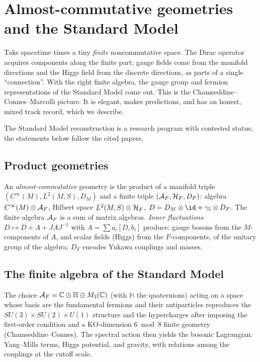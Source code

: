 \section{Almost-commutative geometries and the Standard Model}\label{ch:almost_comm}
\skippable

\begin{physmotiv}
Take spacetime times a tiny \emph{finite} noncommutative space. The Dirac operator acquires components along the finite part; gauge fields come from the manifold directions and the Higgs field from the discrete directions, as parts of a single ``connection''. With the right finite algebra, the gauge group and fermion representations of the Standard Model come out. This is the Chamseddine--Connes--Marcolli picture. It is elegant, makes predictions, and has an honest, mixed track record, which we describe.
\end{physmotiv}

\begin{unsettled}
The Standard Model reconstruction is a research program with contested status; the statements below follow the cited papers.
\end{unsettled}

\subsection{Product geometries}

An \emph{almost-commutative} geometry is the product of a manifold triple $(C^\infty(M),L^2(M,S),D_M)$ and a finite triple $(\mathcal{A}_F,\mathcal{H}_F,D_F)$: algebra $C^\infty(M)\otimes\mathcal{A}_F$, Hilbert space $L^2(M,S)\otimes\mathcal{H}_F$, $D=D_M\otimes\id+\gamma_5\otimes D_F$. The finite algebra $\mathcal{A}_F$ is a sum of matrix algebras. \emph{Inner fluctuations} $D\mapsto D+A+JAJ^{-1}$ with $A=\sum a_i[D,b_i]$ produce: gauge bosons from the $M$-components of $A$, and scalar fields (Higgs) from the $F$-components, of the unitary group of the algebra; $D_F$ encodes Yukawa couplings and masses.

\subsection{The finite algebra of the Standard Model}

The choice $\mathcal{A}_F=\mathbb{C}\oplus\mathbb H\oplus M_3(\mathbb{C})$ (with $\mathbb H$ the quaternions) acting on a space whose basis are the fundamental fermions and their antiparticles reproduces the $SU(3)\times SU(2)\times U(1)$ structure and the hypercharges after imposing the first-order condition and a KO-dimension $6\bmod8$ finite geometry (Chamseddine--Connes). The spectral action then yields the bosonic Lagrangian: Yang--Mills terms, Higgs potential, and gravity, with relations among the couplings at the cutoff scale.

